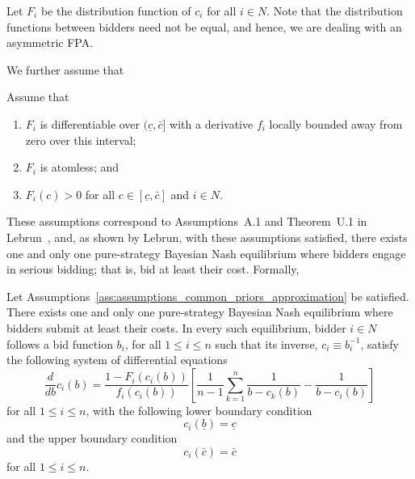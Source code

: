 Let $F_i$ be the distribution function of $c_i$ for all $i\in N$. Note that the distribution functions between bidders need not be equal, and hence, we are dealing with an asymmetric FPA.

We further assume that
\begin{assumptions}
\label{ass:assumptions_common_priors_approximation}
Assume that
\begin{enumerate}
  \item $F_i$ is differentiable over $(\underline{c}, \bar{c}]$ with a derivative $f_i$ locally bounded away from zero over this interval;
  \item $F_i$ is atomless; and
  \item $F_i(c)>0$ for all $c\in [\underline{c}, \bar{c}]$ and $i\in N$.
\end{enumerate}
\end{assumptions}
These assumptions correspond to Assumptions~A.1 and Theorem~U.1 in Lebrun~\cite{Lebrun2006}, and, as shown by Lebrun, with these assumptions satisfied, there exists one and only one pure-strategy Bayesian Nash equilibrium where bidders engage in serious bidding; that is, bid at least their cost. Formally,
\begin{proposition}
\label{prop:characterization_of_the_equilibrium_in_common_priors_setting_approximation}
Let Assumptions~\ref{ass:assumptions_common_priors_approximation} be satisfied. There exists one and only one pure-strategy Bayesian Nash equilibrium where bidders submit at least their costs. In every such equilibrium, bidder $i\in N$ follows a bid function $b_i$, for all $1\leq i\leq n$ such that its inverse, $c_i\equiv b_i^{-1}$, satisfy the following system of differential equations
\begin{equation*}
  \frac{d}{db}c_i(b) = \frac{1 - F_i(c_i(b))}{f_i(c_i(b))}\left[ \frac{1}{n-1}\sum_{k=1}^n \frac{1}{b-c_k(b)} - \frac{1}{b-c_i(b)} \right]
\end{equation*}
for all $1\leq i\leq n$, with the following lower boundary condition
\begin{equation}
  \label{eq:foc_ode_lower_boundary_approximation}
  c_i(\underline{b}) = \underline{c}
\end{equation}
and the upper boundary condition
\begin{equation}
  \label{eq:foc_ode_upper_boundary_approximation}
  c_i(\bar{c}) = \bar{c}
\end{equation}
for all $1\leq i\leq n$.
\end{proposition}

